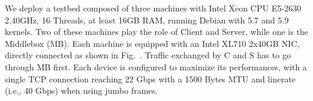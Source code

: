 
We deploy a testbed composed of three machines with Intel Xeon CPU E5-2630
2.40GHz, 16 Threads, at least 16GB RAM, running Debian with 5.7 and
5.9 kernels. Two of these machines play the role of Client and Server,
while one is the Middlebox (MB). Each machine is equipped with an
Intel XL710 2x40GB NIC, directly connected as shown in Fig.~.
Traffic exchanged by C and S has to go through MB first. Each device is
configured to maximize its performances, with a single TCP connection
reaching 22 Gbps with a 1500 Bytes MTU and linerate (i.e., 40 Gbps) when
using jumbo frames.

